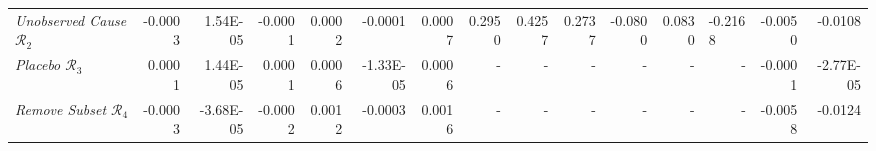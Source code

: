 \begin{table*}[b]
{\begin{tabular}{l|rrr|rrr|rrrrrl|rr}
\textit{Unobserved Cause $\mathcal{R}_2$}                                                                           & -0.0003                                 & 1.54E-05                               & -0.0001                                & 0.0002                                   & -0.0001                                  & 0.0007                                   & 0.2950                            & 0.4257                            & \multicolumn{1}{r|}{0.2737}       & -0.0800                           & 0.0830                            & -0.2168                           & -0.0050                                                         & -0.0108                                                       \\
\textit{Placebo $\mathcal{R}_3$}                                                                                          & 0.0001                                  & 1.44E-05                               & 0.0001                                 & 0.0006                                   & -1.33E-05                                & 0.0006                                   & -                               & -                               & \multicolumn{1}{r|}{-}          & -                               & -                               & \multicolumn{1}{r|}{-}          & -0.0001                                                         & -2.77E-05                                                     \\
\textit{Remove Subset $\mathcal{R}_4$}                                                                                    & -0.0003                                 & -3.68E-05                              & -0.0002                                & 0.0012                                   & -0.0003                                  & 0.0016                                   & -                               & -                               & \multicolumn{1}{r|}{-}          & -                               & -                               & \multicolumn{1}{r|}{-}          & -0.0058                                                         & -0.0124                                                       \\ \hline
\end{tabular}
}
\end{table*}